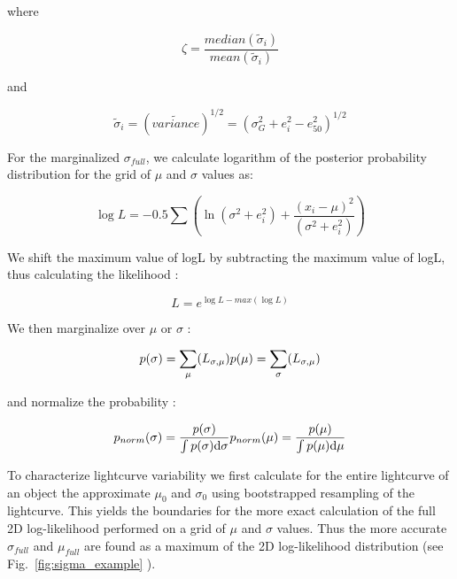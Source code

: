 \documentclass[fleqn,usenatbib]{mnras}  %
\begin{document}
where 

\begin{equation}
\zeta = \frac{median(\widetilde{\sigma}_{i})} {mean(\widetilde{\sigma}_{i})}
\end{equation}

and 

\begin{equation}
\widetilde{\sigma}_{i} =  ( \widetilde{variance} )^{1/2} = ( \sigma_{G}^{2} + e_{i}^{2} - e_{50}^{2} )^{1/2}
\end{equation}


For the marginalized $\sigma_{full}$, we calculate logarithm of the posterior probability distribution for the grid of $\mu$ and $\sigma$ values as:

\begin{equation}
\log{L} = -0.5 \sum \left( \ln(\sigma^{2}+e_{i}^{2}) + \frac{(x_{i}-\mu)^{2}}{(\sigma^{2}+e_{i}^{2})} \right)
\end{equation}

We shift the maximum value of logL by subtracting the maximum value of logL, thus calculating the likelihood : 

\begin{equation}
L = e^{\log{L} - max(\log{L})}
\end{equation}

We then marginalize over $\mu$ or $\sigma$ : 

\begin{equation}
p(\sigma) = \sum_{\mu}(L_{\sigma,\mu}) \\
p(\mu) = \sum_{\sigma}(L_{\sigma,\mu})
\end{equation}

and normalize the probability :

\begin{equation}
p_{norm}(\sigma) = \frac{p(\sigma)}{ \int {p(\sigma) \text{d}\sigma}} \\ 
p_{norm}(\mu) = \frac{p(\mu)} {\int {p(\mu) \text{d}\mu} }
\end{equation}


To characterize  lightcurve variability we first calculate for the entire lightcurve of an object  the approximate $\mu_{0}$ and $\sigma_{0}$ using bootstrapped resampling of the lightcurve.  This yields the boundaries for the more exact calculation of the full 2D log-likelihood performed on a grid of $\mu$ and $\sigma$ values. Thus the more accurate $\sigma_{full}$ and $\mu_{full}$ are found as a maximum of the 2D log-likelihood distribution (see Fig.~\ref{fig:sigma_example} ).
\end{document}

